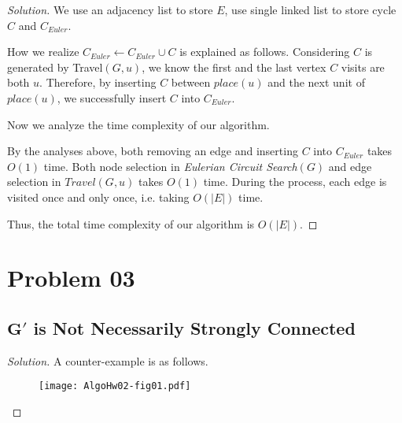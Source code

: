 \documentclass{article}
\newenvironment{solution}{\begin{proof}[\noindent\it Solution]}{\end{proof}}
\begin{document}
\begin{solution}
\vspace{-1em} \hspace{1.3em}
We use an adjacency list to store $E$, use single linked list to store cycle $C$ and $C_{Euler}$. 

\hspace{1.3em}
How we realize $C_{Euler}\gets C_{Euler}\cup C$ is explained as follows. Considering $C$ is generated by Travel$(G,u)$, we know the first and the last vertex $C$ visits are both $u$. Therefore, by inserting $C$ between $place(u)$ and the next unit of $place(u)$, we successfully insert $C$ into $C_{Euler}$.

\vspace{2em} \hspace{1.3em}
Now we analyze the time complexity of our algorithm.

\hspace{1.3em}
By the analyses above, both removing an edge and inserting $C$ into $C_{Euler}$ takes $O(1)$ time. Both node selection in \textit{Eulerian Circuit Search$(G)$} and edge selection in $Travel(G,u)$ takes $O(1)$ time. During the process, each edge is visited once and only once, i.e. taking $O(|E|)$ time.

\hspace{1.3em}
Thus, the total time complexity of our algorithm is $O(|E|).$
\end{solution}

\vspace{2em}
\section{Problem 03}
\vspace{1em}
\subsection{$\boldsymbol{G'}$ is Not Necessarily Strongly Connected}

\vspace{1em}
\begin{solution}
    A counter-example is as follows.
    \vspace{-0.5em}
    \begin{figure}[htbp]
    	\centering
    	{\texttt{[image: AlgoHw02-fig01.pdf]}}
    \end{figure}
\end{solution}

\vspace{1em}
\end{document}
